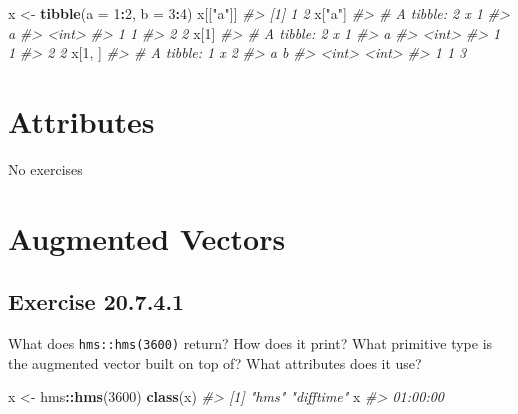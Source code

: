 \documentclass[]{book}
\newenvironment{Shaded}{\begin{snugshade}}{\end{snugshade}}
\newcommand{\CommentTok}[1]{\textcolor[rgb]{0.56,0.35,0.01}{\textit{#1}}}
\newcommand{\DataTypeTok}[1]{\textcolor[rgb]{0.13,0.29,0.53}{#1}}
\newcommand{\DecValTok}[1]{\textcolor[rgb]{0.00,0.00,0.81}{#1}}
\newcommand{\KeywordTok}[1]{\textcolor[rgb]{0.13,0.29,0.53}{\textbf{#1}}}
\newcommand{\NormalTok}[1]{#1}
\newcommand{\OperatorTok}[1]{\textcolor[rgb]{0.81,0.36,0.00}{\textbf{#1}}}
\newcommand{\StringTok}[1]{\textcolor[rgb]{0.31,0.60,0.02}{#1}}
\theoremstyle{plain}
\theoremstyle{remark}
\begin{document}
\begin{Shaded}
\begin{Highlighting}[]
\NormalTok{x <-}\StringTok{ }\KeywordTok{tibble}\NormalTok{(}\DataTypeTok{a =} \DecValTok{1}\OperatorTok{:}\DecValTok{2}\NormalTok{, }\DataTypeTok{b =} \DecValTok{3}\OperatorTok{:}\DecValTok{4}\NormalTok{)}
\NormalTok{x[[}\StringTok{"a"}\NormalTok{]]}
\CommentTok{#> [1] 1 2}
\NormalTok{x[}\StringTok{"a"}\NormalTok{]}
\CommentTok{#> # A tibble: 2 x 1}
\CommentTok{#>       a}
\CommentTok{#>   <int>}
\CommentTok{#> 1     1}
\CommentTok{#> 2     2}
\NormalTok{x[}\DecValTok{1}\NormalTok{]}
\CommentTok{#> # A tibble: 2 x 1}
\CommentTok{#>       a}
\CommentTok{#>   <int>}
\CommentTok{#> 1     1}
\CommentTok{#> 2     2}
\NormalTok{x[}\DecValTok{1}\NormalTok{, ]}
\CommentTok{#> # A tibble: 1 x 2}
\CommentTok{#>       a     b}
\CommentTok{#>   <int> <int>}
\CommentTok{#> 1     1     3}
\end{Highlighting}
\end{Shaded}

\hypertarget{attributes}{%
\section{Attributes}\label{attributes}}

No exercises

\hypertarget{augmented-vectors}{%
\section{Augmented Vectors}\label{augmented-vectors}}

\hypertarget{exercise-20.7.4.1}{%
\subsection*{\texorpdfstring{Exercise
{20.7.4.1}}{Exercise 20.7.4.1}}\label{exercise-20.7.4.1}}

What does \texttt{hms::hms(3600)} return? How does it print? What
primitive type is the augmented vector built on top of? What attributes
does it use?

\begin{Shaded}
\begin{Highlighting}[]
\NormalTok{x <-}\StringTok{ }\NormalTok{hms}\OperatorTok{::}\KeywordTok{hms}\NormalTok{(}\DecValTok{3600}\NormalTok{)}
\KeywordTok{class}\NormalTok{(x)}
\CommentTok{#> [1] "hms"      "difftime"}
\NormalTok{x}
\CommentTok{#> 01:00:00}
\end{Highlighting}
\end{Shaded}
\end{document}
